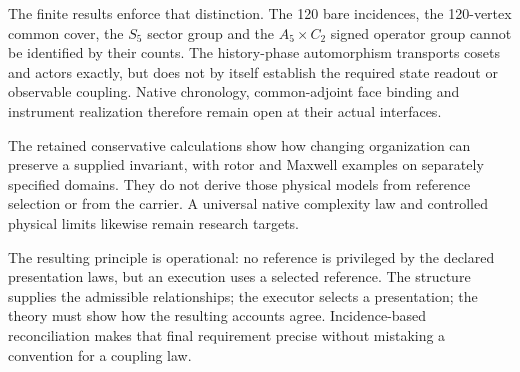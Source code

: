 The finite results enforce that distinction. The 120 bare incidences, the 120-vertex common cover, the $S_5$ sector group and the $A_5\times C_2$ signed operator group cannot be identified by their counts. The history-phase automorphism transports cosets and actors exactly, but does not by itself establish the required state readout or observable coupling. Native chronology, common-adjoint face binding and instrument realization therefore remain open at their actual interfaces.

The retained conservative calculations show how changing organization can preserve a supplied invariant, with rotor and Maxwell examples on separately specified domains. They do not derive those physical models from reference selection or from the carrier. A universal native complexity law and controlled physical limits likewise remain research targets.

The resulting principle is operational: no reference is privileged by the declared presentation laws, but an execution uses a selected reference. The structure supplies the admissible relationships; the executor selects a presentation; the theory must show how the resulting accounts agree. Incidence-based reconciliation makes that final requirement precise without mistaking a convention for a coupling law.
